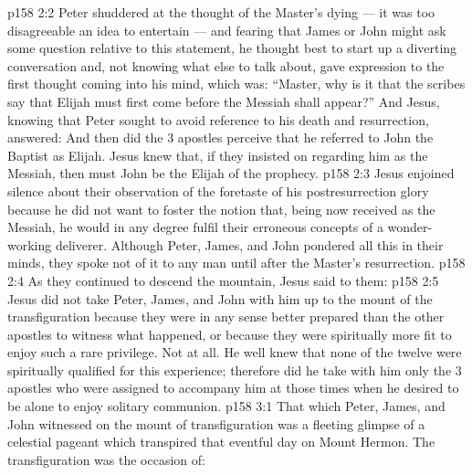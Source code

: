 \vs p158 2:2 Peter shuddered at the thought of the Master’s dying --- it was too disagreeable an idea to entertain --- and fearing that James or John might ask some question relative to this statement, he thought best to start up a diverting conversation and, not knowing what else to talk about, gave expression to the first thought coming into his mind, which was: “Master, why is it that the scribes say that Elijah must first come before the Messiah shall appear?” And Jesus, knowing that Peter sought to avoid reference to his death and resurrection, answered:  And then did the 3 apostles perceive that he referred to John the Baptist as Elijah. Jesus knew that, if they insisted on regarding him as the Messiah, then must John be the Elijah of the prophecy.
\vs p158 2:3 Jesus enjoined silence about their observation of the foretaste of his postresurrection glory because he did not want to foster the notion that, being now received as the Messiah, he would in any degree fulfil their erroneous concepts of a wonder\hyp{}working deliverer. Although Peter, James, and John pondered all this in their minds, they spoke not of it to any man until after the Master’s resurrection.
\vs p158 2:4 As they continued to descend the mountain, Jesus said to them: 
\vs p158 2:5 Jesus did not take Peter, James, and John with him up to the mount of the transfiguration because they were in any sense better prepared than the other apostles to witness what happened, or because they were spiritually more fit to enjoy such a rare privilege. Not at all. He well knew that none of the twelve were spiritually qualified for this experience; therefore did he take with him only the 3 apostles who were assigned to accompany him at those times when he desired to be alone to enjoy solitary communion.
\vs p158 3:1 That which Peter, James, and John witnessed on the mount of transfiguration was a fleeting glimpse of a celestial pageant which transpired that eventful day on Mount Hermon. The transfiguration was the occasion of:
